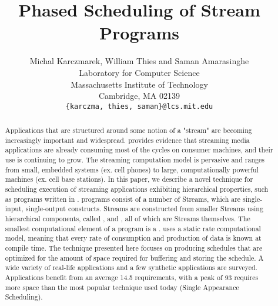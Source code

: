 \documentclass[runningheads,roman]{article}
\title{Phased Scheduling of Stream Programs}
\author{Michal Karczmarek, William Thies and Saman
Amarasinghe \\
Laboratory for Computer Science \\
        Massachusetts Institute of Technology \\
        Cambridge, MA  02139 \\
\texttt{\{karczma, thies, saman\}@lcs.mit.edu} \vspace{-24pt}}
\date{}
\begin{document}
\maketitle



\vspace{0.1in}

\begin{abstract}
Applications that are structured around some notion of a "stream"
are becoming increasingly important and widespread. \cite{Rix98}
provides evidence that streaming media applications are already
consuming most of the cycles on consumer machines, and their use
is continuing to grow. The streaming computation model is
pervasive and ranges from small, embedded systems (ex. cell
phones) to large, computationally powerful machines (ex. cell base
stations).
%
In this paper, we describe a novel technique for scheduling
execution of streaming applications exhibiting hierarchical
properties, such as programs written in \StreamIt. \StreamIt
programs consist of a number of Streams, which are single-input,
single-output constructs. Streams are constructed from smaller
Streams using hierarchical components, called \pipeline,
\splitjoin and \feedbackloop, all of which are Streams themselves.
The smallest computational element of a \StreamIt program is a
\filter. \StreamIt uses a static rate computational model, meaning
that every \filters rate of consumption and production of data is
known at compile time.
%
The technique presented here focuses on producing schedules that
are optimized for the amount of space required for buffering and
storing the schedule. A wide variety of real-life applications and
a few synthetic applications are
surveyed. Applications benefit from an average 14.5%
requirements, with a peak of 93%
requires more space than the most popular technique used today
(Single Appearance Scheduling).
\end{abstract}

%
%

%




%



%


%



\end{document}
